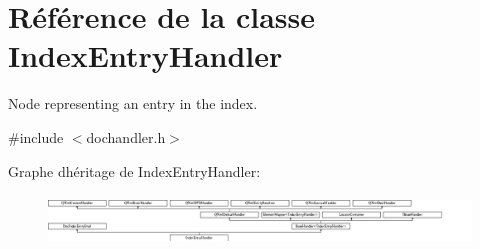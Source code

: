 \hypertarget{class_index_entry_handler}{}\section{Référence de la classe Index\+Entry\+Handler}
\label{class_index_entry_handler}


Node representing an entry in the index.  




{\ttfamily \#include $<$dochandler.\+h$>$}

Graphe d\textquotesingle{}héritage de Index\+Entry\+Handler\+:\begin{figure}[H]
\begin{center}
\leavevmode
\includegraphics[height=1.350211cm]{class_index_entry_handler}
\end{center}
\end{figure}
